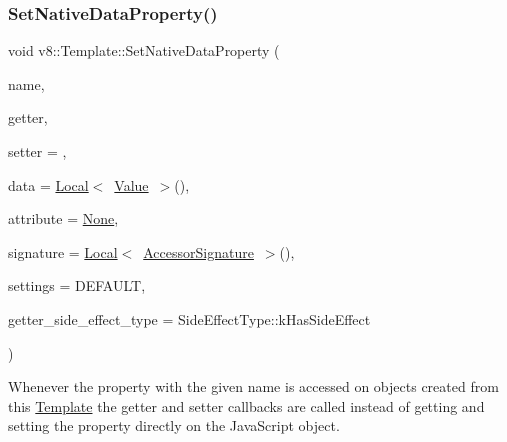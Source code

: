 \subsubsection{\texorpdfstring{Set\+Native\+Data\+Property()}{SetNativeDataProperty()}}
{\footnotesize\ttfamily void v8\+::\+Template\+::\+Set\+Native\+Data\+Property (\begin{DoxyParamCaption}\item[{\mbox{\hyperlink{classv8_1_1Local}{Local}}$<$ \mbox{\hyperlink{classv8_1_1String}{String}} $>$}]{name,  }\item[{\mbox{\hyperlink{namespacev8_a722613c87061708a4f1aa050d095f868}{Accessor\+Getter\+Callback}}}]{getter,  }\item[{Accessor\+Setter\+Callback}]{setter = {},  }\item[{\mbox{\hyperlink{classv8_1_1Local}{Local}}$<$ \mbox{\hyperlink{classv8_1_1Value}{Value}} $>$}]{data = {\ttfamily \mbox{\hyperlink{classv8_1_1Local}{Local}}$<$~\mbox{\hyperlink{classv8_1_1Value}{Value}}~$>$()},  }\item[{\mbox{\hyperlink{namespacev8_a05f25f935e108a1ea2d150e274602b87}{Property\+Attribute}}}]{attribute = {\ttfamily \mbox{\hyperlink{namespacev8_a05f25f935e108a1ea2d150e274602b87a7ab4d58719c33b3ea2dfaefa29b111df}{None}}},  }\item[{\mbox{\hyperlink{classv8_1_1Local}{Local}}$<$ \mbox{\hyperlink{classv8_1_1AccessorSignature}{Accessor\+Signature}} $>$}]{signature = {\ttfamily \mbox{\hyperlink{classv8_1_1Local}{Local}}$<$~\mbox{\hyperlink{classv8_1_1AccessorSignature}{Accessor\+Signature}}~$>$()},  }\item[{\mbox{\hyperlink{namespacev8_a31d8355cb043d7d2dda3f4a52760b64e}{Access\+Control}}}]{settings = {\ttfamily DEFAULT},  }\item[{\mbox{\hyperlink{namespacev8_a29711319c2b9fc7716d65faee2f7b9cb}{Side\+Effect\+Type}}}]{getter\+\_\+side\+\_\+effect\+\_\+type = {\ttfamily SideEffectType\+:\+:kHasSideEffect} }\end{DoxyParamCaption})}

Whenever the property with the given name is accessed on objects created from this \mbox{\hyperlink{classv8_1_1Template}{Template}} the getter and setter callbacks are called instead of getting and setting the property directly on the Java\+Script object.


